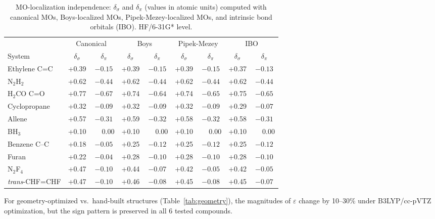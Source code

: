 \documentclass[twoside,natbib]{svjour3}
\newcommand{\delsg}{\delta_{\sigma}}
\newcommand{\delpi}{\delta_{\pi}}
\newcommand{\eps}{\varepsilon}
\begin{document}
\begin{table}[t]
\centering
\caption{MO-localization independence: $\delsg$ and $\delpi$
(values in atomic units) computed with canonical MOs, Boys-localized
MOs, Pipek-Mezey-localized MOs, and intrinsic bond orbitals
(IBO). HF/6-31G* level.}
\label{tab:lmo}
\begin{tabular}{lcccccccc}
\toprule
& \multicolumn{2}{c}{Canonical} & \multicolumn{2}{c}{Boys} & \multicolumn{2}{c}{Pipek-Mezey} & \multicolumn{2}{c}{IBO} \\
\cmidrule(lr){2-3}\cmidrule(lr){4-5}\cmidrule(lr){6-7}\cmidrule(lr){8-9}
System & $\delsg$ & $\delpi$ & $\delsg$ & $\delpi$ & $\delsg$ & $\delpi$ & $\delsg$ & $\delpi$ \\
\midrule
Ethylene C=C       & +0.39 & $-0.15$ & +0.39 & $-0.15$ & +0.39 & $-0.15$ & +0.37 & $-0.13$ \\
N$_2$H$_2$         & +0.62 & $-0.44$ & +0.62 & $-0.44$ & +0.62 & $-0.44$ & +0.62 & $-0.44$ \\
H$_2$CO C=O        & +0.77 & $-0.67$ & +0.74 & $-0.64$ & +0.74 & $-0.65$ & +0.75 & $-0.65$ \\
Cyclopropane       & +0.32 & $-0.09$ & +0.32 & $-0.09$ & +0.32 & $-0.09$ & +0.29 & $-0.07$ \\
Allene             & +0.57 & $-0.31$ & +0.59 & $-0.32$ & +0.58 & $-0.32$ & +0.58 & $-0.31$ \\
BH$_3$             & +0.10 & $\phantom{-}0.00$ & +0.10 & $\phantom{-}0.00$ & +0.10 & $\phantom{-}0.00$ & +0.10 & $\phantom{-}0.00$ \\
Benzene C--C       & +0.18 & $-0.05$ & +0.25 & $-0.12$ & +0.25 & $-0.12$ & +0.25 & $-0.12$ \\
Furan              & +0.22 & $-0.04$ & +0.28 & $-0.10$ & +0.28 & $-0.10$ & +0.28 & $-0.10$ \\
N$_2$F$_4$         & +0.47 & $-0.10$ & +0.44 & $-0.07$ & +0.42 & $-0.05$ & +0.42 & $-0.05$ \\
\textit{trans}-CHF=CHF & +0.47 & $-0.10$ & +0.46 & $-0.08$ & +0.45 & $-0.08$ & +0.45 & $-0.07$ \\
\bottomrule
\end{tabular}
\end{table}

For geometry-optimized vs.\ hand-built structures
(Table~\ref{tab:geometry}), the magnitudes of $\eps$ change by 10--30\%
under B3LYP/cc-pVTZ optimization, but the sign pattern is preserved
in all 6 tested compounds.
\end{document}
